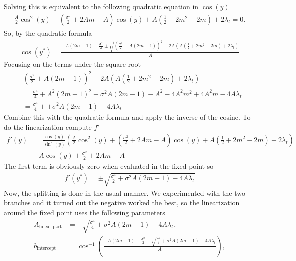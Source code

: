 Solving this is equivalent to the following quadratic equation in $\cos(y)$
\begin{align}
    \frac{A}{2}\cos^2(y) + \left(\frac{\sigma^2}{2} + 2 Am - A\right)\cos(y)
    + A \left(\frac{1}{2} + 2m^2 - 2m\right) + 2\lambda_t = 0.
\end{align}
So, by the quadratic formula
\begin{align}
    \cos(y^*) = \frac{-A\left(2m - 1\right) - \frac{\sigma^2}{2}\pm\sqrt{\left(\frac{\sigma^2}{2}+A\left(2m - 1\right)\right)^2 - 2A\left(A \left(\frac{1}{2} + 2m^2 - 2m\right) + 2\lambda_t\right)}}{A}\nonumber
\end{align}
Focusing on the terms under the square-root
\begin{align*}
    &\left(\frac{\sigma^2}{2}+A\left(2m - 1\right)\right)^2 - 2A\left(A \left(\frac{1}{2} + 2m^2 - 2m\right) + 2\lambda_t\right) \\
    &= \frac{\sigma^4}{4} + A^2\left(2m - 1\right)^2 + \sigma^2A\left(2m - 1\right)- A^2- 4A^2m^2 + 4A^2m-4A\lambda_t\\
    &= \frac{\sigma^4}{4} + +\sigma^2A\left(2m - 1\right) - 4A\lambda_t
\end{align*}
Combine this with the quadratic formula and apply the inverse of the cosine. To do the linearization compute $f'$
\begin{align}
    f'(y) &= \frac{\cos(y)}{\sin^2(y)}\left(\frac{A}{2}\cos^2(y) + \left(\frac{\sigma^2}{2} + 2 Am - A\right)\cos(y)
    + A \left(\frac{1}{2} + 2m^2 - 2m\right) + 2\lambda_t\right) \nonumber\\
    &+ A\cos(y) + \frac{\sigma^2}{2} + 2Am - A
\end{align}
The first term is obviously zero when evaluated in the fixed point so
\begin{align}
    f'(y^*) = \pm \sqrt{\frac{\sigma^4}{2} + \sigma^2A\left(2m - 1\right) - 4A\lambda_t}
\end{align}
Now, the splitting is done in the usual manner. We experimented with the two branches and it turned out the negative worked the best, so the linearization around the fixed point uses the following parameters 
\begin{align}
    A_{\mathrm{linear\_part}} &= -\sqrt{\frac{\sigma^4}{4} + \sigma^2A\left(2m - 1\right) - 4A\lambda_t},\\
    b_{\mathrm{intercept}} &= \cos^{-1}\left(\frac{-A\left(2m - 1\right) - \frac{\sigma^2}{2} - \sqrt{\frac{\sigma^4}{4} + \sigma^2A\left(2m - 1\right) - 4A\lambda_t}}{A}\right),
\end{align}
